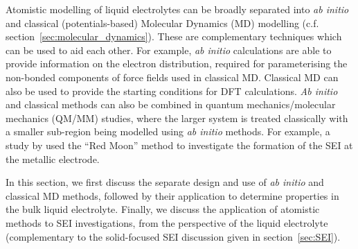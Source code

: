 \documentclass[../main.tex]{subfiles}
\begin{document}
Atomistic modelling of liquid electrolytes can be broadly separated into \textit{ab initio} and classical (potentials-based) Molecular Dynamics (MD) modelling (c.f. section~\ref{sec:molecular_dynamics}). These are complementary techniques which can be used to aid each other. For example, \textit{ab initio} calculations are able to provide information on the electron distribution, required for parameterising the non-bonded components of force fields used in classical MD. Classical MD can also be used to provide the starting conditions for DFT calculations. \textit{Ab initio} and classical methods can also be combined in quantum mechanics/molecular mechanics (QM/MM) studies, where the larger system is treated classically with a smaller sub-region being modelled using \textit{ab initio} methods. For example, a study by \citeauthor{Fujie_2018} used the ``Red Moon'' method to investigate the formation of the SEI at the metallic electrode.\cite{Fujie_2018}

In this section, we first discuss the separate design and use of \textit{ab initio} and classical MD methods, followed by their application to determine properties in the bulk liquid electrolyte. Finally, we discuss the application of atomistic methods to SEI investigations, from the perspective of the liquid electrolyte (complementary to the solid-focused SEI discussion given in section~\ref{sec:SEI}).
\end{document}
